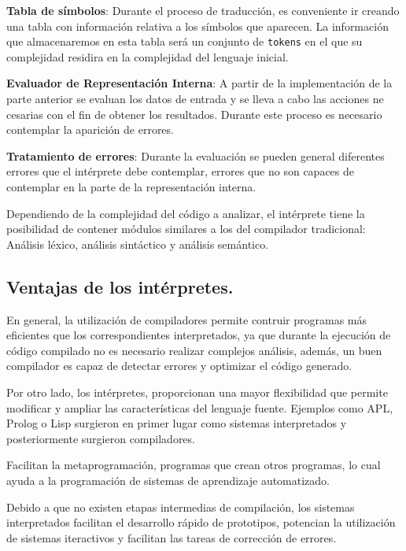 \documentclass{article}
\begin{document}
    \textbf{Tabla de símbolos}: Durante el proceso de traducción, es conveniente ir creando una tabla con información
    relativa a los símbolos que aparecen. La información que almacenaremos en esta tabla será un conjunto de \texttt{tokens}
    en el que su complejidad residira en la complejidad del lenguaje inicial.

    \textbf{Evaluador de Representación Interna}: A partir de la implementación de la parte anterior se evaluan los datos
    de entrada y se lleva a cabo las acciones ne cesarias con el fin de obtener los resultados. Durante este proceso es
    necesario contemplar la aparición de errores.

    \textbf{Tratamiento de errores}: Durante la evaluación se pueden general diferentes errores que el intérprete debe
    contemplar, errores que no son capaces de contemplar en la parte de la representación interna.

    Dependiendo de la complejidad del código a analizar, el intérprete tiene la posibilidad de contener módulos similares
    a los del compilador tradicional: Análisis léxico, análisis sintáctico y análisis semántico.

    \subsection{Ventajas de los intérpretes.}

    En general, la utilización de compiladores permite contruir programas más eficientes que los correspondientes interpretados,
    ya que durante la ejecución de código compilado no es necesario realizar complejos análisis, además, un buen compilador es
    capaz de detectar errores y optimizar el código generado.

    Por otro lado, los intérpretes, proporcionan una mayor flexibilidad que permite modificar
    y ampliar las características del lenguaje fuente. Ejemplos como APL, Prolog o Lisp surgieron en primer lugar
    como sistemas interpretados y posteriormente surgieron compiladores.

    Facilitan la metaprogramación, programas que crean otros programas, lo cual ayuda a la programación de sistemas de
    aprendizaje automatizado.

    Debido a que no existen etapas intermedias de compilación, los sistemas interpretados facilitan el desarrollo rápido
    de prototipos, potencian la utilización de sistemas iteractivos y facilitan las tareas de corrección de errores.
\end{document}
